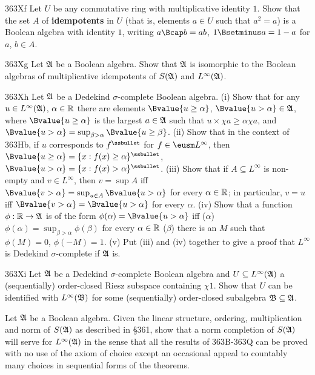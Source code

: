 {\spheader 363Xf Let $U$ be any commutative ring with
multiplicative identity $1$.   Show that the set $A$ of
{\bf idempotents} in $U$ (that is, elements $a\in U$ such that $a^2=a$)
is a Boolean algebra with identity $1$, writing $a\Bcap b=ab$,
$1\Bsetminus a=1-a$ for $a$, $b\in A$.

\spheader 363Xg Let $\frak A$ be a Boolean algebra.   Show that
$\frak A$ is isomorphic to the Boolean algebras of multiplicative
idempotents of $S(\frak A)$ and $L^{\infty}(\frak A)$.

\spheader 363Xh Let $\frak A$ be a Dedekind $\sigma$-complete Boolean
algebra.  (i) Show that for any $u\in L^{\infty}(\frak A)$,
$\alpha\in\Bbb R$ there are elements $\Bvalue{u\ge\alpha}$,
$\Bvalue{u>\alpha}\in\frak A$, where $\Bvalue{u\ge\alpha}$ is the
largest $a\in\frak A$ such that $u\times\chi a\ge\alpha\chi a$, 
and $\Bvalue{u>\alpha}=\sup_{\beta>\alpha}\Bvalue{u\ge\beta}$.
(ii) Show that in the context of 363Hb, if $u$ corresponds to
$f^{\ssbullet}$ for $f\in\eusm L^{\infty}$, then
$\Bvalue{u\ge\alpha}=\{x:f(x)\ge\alpha\}^{\ssbullet}$,
$\Bvalue{u>\alpha}=\{x:f(x)>\alpha\}^{\ssbullet}$.   (iii) Show that if
$A\subseteq L^{\infty}$ is non-empty and $v\in L^{\infty}$, then $v=\sup
A$ iff $\Bvalue{v>\alpha}=\sup_{u\in A}\Bvalue{u>\alpha}$ for every
$\alpha\in\Bbb R$;  in particular, $v=u$ iff
$\Bvalue{v>\alpha}=\Bvalue{u>\alpha}$ for every $\alpha$. (iv) Show that
a function $\phi:\Bbb R\to\frak A$ is of the form
$\phi(\alpha)=\Bvalue{u>\alpha}$ iff ($\alpha$)
$\phi(\alpha)=\sup_{\beta>\alpha}\phi(\beta)$ for every $\alpha\in\Bbb
R$ ($\beta$) there is an $M$ such that $\phi(M)=0$, $\phi(-M)=1$.   (v)
Put (iii) and (iv) together to give a proof that $L^{\infty}$ is
Dedekind $\sigma$-complete if $\frak A$ is.

\spheader 363Xi Let $\frak A$ be a Dedekind $\sigma$-complete Boolean
algebra and $U\subseteq L^{\infty}(\frak A)$ a (sequentially)
order-closed Riesz subspace containing $\chi 1$.   Show that $U$ can be
identified with $L^{\infty}(\frak B)$ for some (sequentially)
order-closed subalgebra $\frak B\subseteq\frak A$.

Let $\frak A$ be a Boolean algebra.
Given the linear structure, ordering, multiplication and norm of
$S(\frak A)$ as described in \S361, show that a norm completion of
$S(\frak A)$ will serve for $L^{\infty}(\frak A)$ in the sense that all
the results of 363B-363Q can be proved with no use of the axiom of
choice except an occasional appeal to countably many choices in
sequential forms of the theorems.

}
